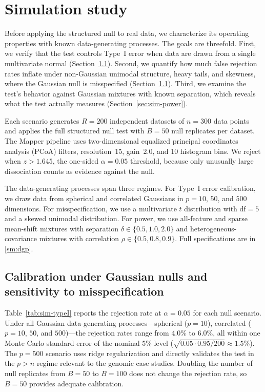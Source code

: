 \documentclass[hidelinks]{siamart251216}
\begin{document}

\section{Simulation study}\label{sec:simulation}

Before applying the structured null to real data, we characterize its
operating properties with known data-generating processes. The goals are
threefold.  First, we verify that the test controls Type~I error when data are
drawn from a single multivariate normal
(Section~\ref{sec:sim-typeI}).  Second, we quantify how much false
rejection rates inflate under non-Gaussian unimodal structure, heavy
tails, and skewness, where the Gaussian null is misspecified
(Section~\ref{sec:sim-typeI}).  Third, we examine the test's behavior against Gaussian mixtures with known
separation, which reveals what the test
actually measures (Section~\ref{sec:sim-power}).

Each scenario generates $R = 200$ independent datasets of $n = 300$
data points and applies the full structured null test with $B = 50$
null replicates per dataset.  The Mapper pipeline uses two-dimensional
equalized principal coordinates analysis (PCoA) filters, resolution~15,
gain~2.0, and 10 histogram bins.  We reject when $z > 1.645$,
the one-sided $\alpha = 0.05$ threshold, because only unusually
large dissociation counts as evidence against the null.

The data-generating processes span three regimes.  For Type~I error
calibration, we draw data from spherical and correlated Gaussians in
$p = 10$, $50$, and $500$ dimensions.  For misspecification, we use a
multivariate $t$ distribution with $\mathrm{df} = 5$ and a skewed
unimodal distribution.  For power, we use all-feature and sparse
mean-shift mixtures with separation $\delta \in \{0.5, 1.0, 2.0\}$
and heterogeneous-covariance mixtures with correlation $\rho \in
\{0.5, 0.8, 0.9\}$.  Full specifications are in \cref{sm:dgp}.


\subsection{Calibration under Gaussian nulls and sensitivity to misspecification}\label{sec:sim-typeI}

Table~\ref{tab:sim-typeI} reports the rejection rate at $\alpha = 0.05$
for each null scenario.  Under all Gaussian data-generating
processes---spherical ($p = 10$), correlated ($p = 10$, $50$, and
$500$)---the rejection rates range from 4.0\% to 6.0\%, all within one
Monte Carlo standard error of the nominal 5\% level
($\sqrt{0.05 \cdot 0.95 / 200} \approx 1.5\%$).  The $p = 500$
scenario uses ridge regularization and directly validates the test in
the $p > n$ regime relevant to the genomic case studies.  Doubling the
number of null replicates from $B = 50$ to $B = 100$ does not change
the rejection rate, so $B = 50$ provides adequate calibration.
\end{document}
